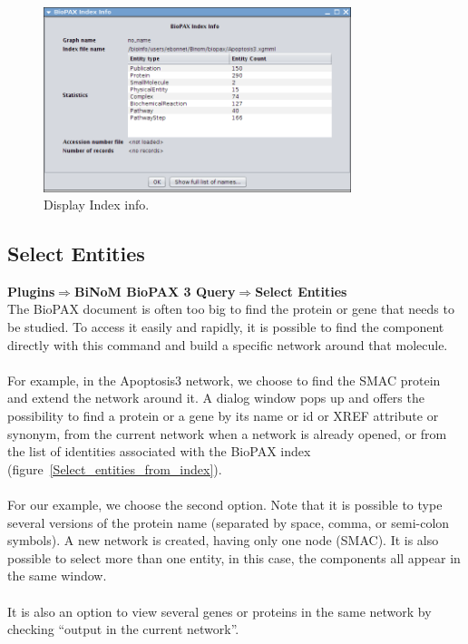\begin{figure}[h]
\centering
\includegraphics[width=0.8\textwidth]{graphics/ebo_biopax_index_info}
\caption{Display Index info.}
\label{BioPAX_Index_Info}
\end{figure}

\subsection{Select Entities}
\textbf{Plugins$\Rightarrow$BiNoM BioPAX 3 Query$\Rightarrow$Select Entities}\\

The BioPAX document is often too big to find the protein or gene that needs to
be studied. To access it easily and rapidly, it is possible to find the
component directly with this command and build a specific network around that
molecule.\\\\
For example, in the Apoptosis3 network, we choose to find the SMAC protein and extend the
network around it. A dialog window pops up and offers the possibility to
find a protein or a gene by its name or id or XREF attribute or synonym, from
the current network when a network is already opened, or from the list of
identities associated with the BioPAX index
(figure~\ref{Select_entities_from_index}).\\\\

For our example, we choose the second option. Note that it is possible to type
several versions of the protein name (separated by space, comma, or semi-colon
symbols). A new network is created, having only one node (SMAC). It is also
possible to select more than one entity, in this case, the components all appear
in the same window.\\\\

It is also an option to view several genes or proteins in the same network by
checking “output in the current network”.\\\\

